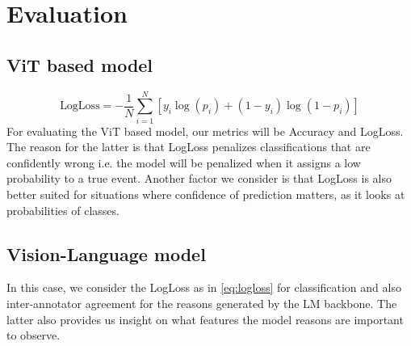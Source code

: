 \documentclass[10pt,twocolumn,letterpaper]{article}
\begin{document}
\section{Evaluation}

\subsection{ViT based model}
\begin{equation}
\text{LogLoss} = - \frac{1}{N} \sum_{i=1}^{N}[y_{i}\log(p_i) + (1 - y_{i}) \log(1 - p_i)]
\label{eq:logloss}
\end{equation}
For evaluating the ViT based model, our metrics will be Accuracy and LogLoss. The reason for the latter is that LogLoss penalizes classifications that are confidently wrong i.e. the model will be penalized when it assigns a low probability to a true event. Another factor we consider is that LogLoss is also better suited for situations where confidence of prediction matters, as it looks at probabilities of classes.

\subsection{Vision-Language model}
In this case, we consider the LogLoss as in \ref{eq:logloss} for classification and also inter-annotator agreement for the reasons generated by the LM backbone. The latter also provides us insight on what features the model reasons are important to observe. 
{\small


}
\end{document}
